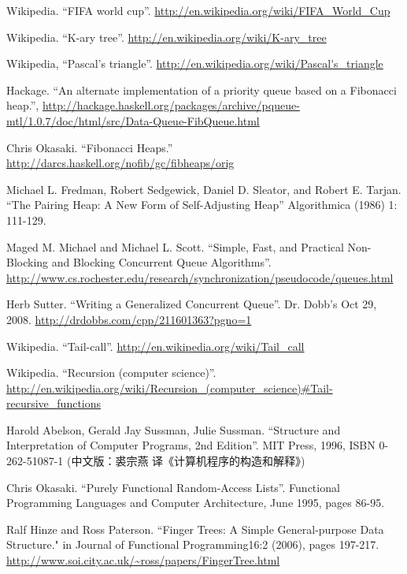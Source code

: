 \begin{thebibliography}{99}
Wikipedia. ``FIFA world cup''. \url{http://en.wikipedia.org/wiki/FIFA_World_Cup}

Wikipedia. ``K-ary tree''. \url{http://en.wikipedia.org/wiki/K-ary_tree}

Wikipedia, ``Pascal's triangle''. \url{http://en.wikipedia.org/wiki/Pascal's_triangle}

Hackage. ``An alternate implementation of a priority queue based on a Fibonacci heap.'', \url{http://hackage.haskell.org/packages/archive/pqueue-mtl/1.0.7/doc/html/src/Data-Queue-FibQueue.html}

Chris Okasaki. ``Fibonacci Heaps.'' \url{http://darcs.haskell.org/nofib/gc/fibheaps/orig}

Michael L. Fredman, Robert Sedgewick, Daniel D. Sleator, and Robert E. Tarjan. ``The Pairing Heap: A New Form of Self-Adjusting Heap'' Algorithmica (1986) 1: 111-129.

Maged M. Michael and Michael L. Scott. ``Simple, Fast, and Practical Non-Blocking and Blocking Concurrent Queue Algorithms''. \url{http://www.cs.rochester.edu/research/synchronization/pseudocode/queues.html}

Herb Sutter. ``Writing a Generalized Concurrent Queue''. Dr. Dobb's Oct 29, 2008. \url{http://drdobbs.com/cpp/211601363?pgno=1}

Wikipedia. ``Tail-call''. \url{http://en.wikipedia.org/wiki/Tail_call}

Wikipedia. ``Recursion (computer science)''. \url{http://en.wikipedia.org/wiki/Recursion_(computer_science)#Tail-recursive_functions}

Harold Abelson, Gerald Jay Sussman, Julie Sussman. ``Structure and Interpretation of Computer Programs, 2nd Edition''. MIT Press, 1996, ISBN 0-262-51087-1 (中文版：裘宗燕 译《计算机程序的构造和解释》)


Chris Okasaki. ``Purely Functional Random-Access Lists''. Functional Programming Languages and Computer Architecture, June 1995, pages 86-95.

Ralf Hinze and Ross Paterson. ``Finger Trees: A Simple General-purpose Data Structure." in Journal of Functional Programming16:2 (2006), pages 197-217. \url{http://www.soi.city.ac.uk/~ross/papers/FingerTree.html}


\end{thebibliography}

